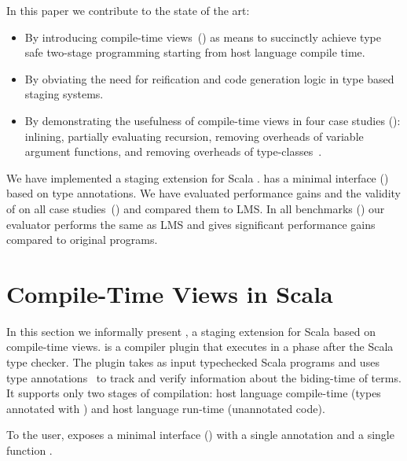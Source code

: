 In this paper we contribute to the state of the art:
\begin{itemize}

 \item By introducing compile-time views~() as means to succinctly achieve
  type safe two-stage programming starting from host language compile time.

 \item By obviating the need for reification and code generation logic in type based staging systems.

 \item By demonstrating the usefulness of compile-time views in four case
  studies (): inlining, partially evaluating recursion,
  removing overheads of variable argument functions, and removing overheads of
  type-classes~\cite{wadler1989make,hall_type_1996,oliveira_type_2010}.

\end{itemize}

We have implemented a staging extension for Scala \tool \footnotemark[3].
 \tool has a minimal interface () based on type annotations.
 We have evaluated performance gains and the validity of \tool on all case
 studies~() and compared them to LMS. In all benchmarks ()
 our evaluator performs the same as LMS and gives significant performance gains compared to original programs.


\section{Compile-Time Views in Scala}
\label{sct:interface}

In this section we informally present \tool, a staging extension for Scala based on compile-time views.
 \tool is a compiler plugin that executes in a phase after the
 Scala type checker. The plugin takes as input typechecked Scala programs and uses
 type annotations~\cite{odersky_1996_putting} to track and verify information about the biding-time
 of terms. It supports only two stages of compilation: host language compile-time
 (types annotated with ) and host language run-time (unannotated code).

To the user, \tool exposes a minimal interface () with
a single annotation  and a single function .

